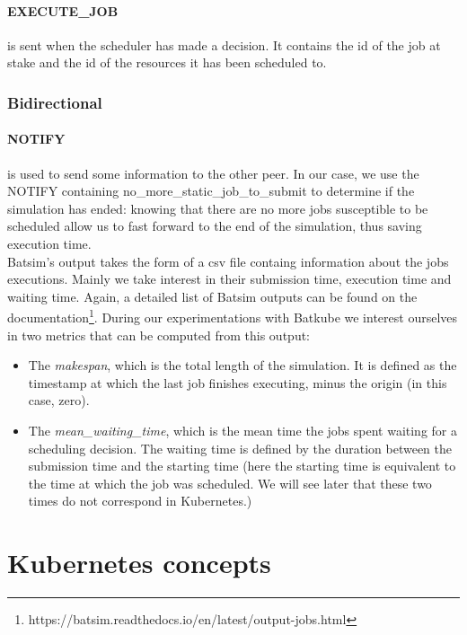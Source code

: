 \paragraph{EXECUTE\_JOB}
is sent when the scheduler has made a decision. It contains the id of the job
at stake and the id of the resources it has been scheduled to.

\subsubsection{Bidirectional}

\paragraph{NOTIFY}
is used to send some information to the other peer. In our case, we use the
NOTIFY containing no\_more\_static\_job\_to\_submit to determine if the
simulation has ended: knowing that there are no more jobs susceptible to be
scheduled allow us to fast forward to the end of the simulation, thus saving
execution time.\\

Batsim's output takes the form of a csv file containg information about the
jobs executions. Mainly we take interest in their submission time, execution
time and waiting time. Again, a detailed list of Batsim outputs can be found on
the
documentation\footnote{https://batsim.readthedocs.io/en/latest/output-jobs.html}.
During our experimentations with Batkube we interest ourselves in two metrics
that can be computed from this output:
\begin{itemize}
	\item The \textit{makespan}, which is the total length of the
		simulation. It is defined as the timestamp at which the last
		job finishes executing, minus the origin (in this case, zero).
	\item The \textit{mean\_waiting\_time}, which is the mean time the jobs
		spent waiting for a scheduling decision. The waiting time is
		defined by the duration between the submission time and the
		starting time (here the starting time is equivalent to the time
		at which the job was scheduled. We will see later that these
		two times do not correspond in Kubernetes.)
\end{itemize}

\section{Kubernetes concepts}

